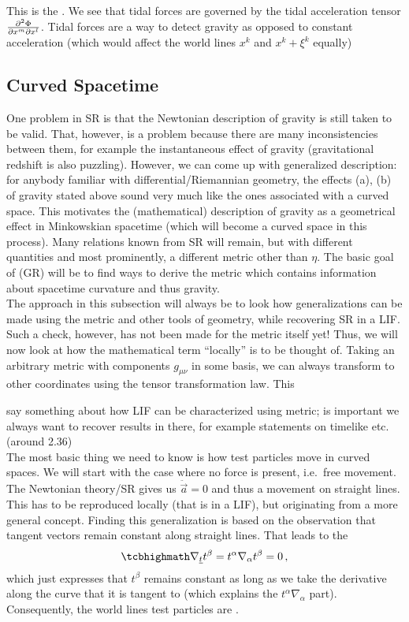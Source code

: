 This is the . We see that tidal forces are governed by the tidal acceleration tensor $\pdv[2]{\Phi}{x^m}{x^l}$. Tidal forces are a way to detect gravity as opposed to constant acceleration (which would affect the world lines $x^k$ and $x^k + \xi^k$ equally)



	\subsection{Curved Spacetime}
One problem in SR is that the Newtonian description of gravity is still taken to be valid. That, however, is a problem because there are many inconsistencies between them, for example the instantaneous effect of gravity (gravitational redshift is also puzzling). However, we can come up with generalized description: for anybody familiar with differential/Riemannian geometry, the effects (a), (b) of gravity stated above sound very much like the ones associated with a curved space. This motivates the (mathematical) description of gravity as a geometrical effect in Minkowskian spacetime (which will become a curved space in this process). Many relations known from SR will remain, but with different quantities and most prominently, a different metric other than $\eta$. The basic goal of  (GR) will be to find ways to derive the metric which contains information about spacetime curvature and thus gravity.\\


The approach in this subsection will always be to look how generalizations can be made using the metric and other tools of geometry, while recovering SR in a LIF. Such a check, however, has not been made for the metric itself yet! Thus, we will now look at how the mathematical term \enquote{locally} is to be thought of. Taking an arbitrary metric with components $g_{\mu \nu}$ in some basis, we can always transform to other coordinates using the tensor transformation law. This

say something about how LIF can be characterized using metric; is important we always want to recover results in there, for example statements on timelike etc. (around 2.36)\\


The most basic thing we need to know is how test particles move in curved spaces. We will start with the case where no force is present, i.e.~free movement. The Newtonian theory/SR gives us $\ddot{\vec{a}} = 0$ and thus a movement on straight lines. This has to be reproduced locally (that is in a LIF), but originating from a more general concept. Finding this generalization is based on the observation that tangent vectors remain constant along straight lines. That leads to the 
\begin{equation}
\eqbox{
\nabla_{\underline{t}} t^\beta = t^\alpha \nabla_\alpha t^\beta = 0
}\, ,
\end{equation}
which just expresses that $t^\beta$ remains constant as long as we take the derivative along the curve that it is tangent to (which explains the $t^\alpha \nabla_\alpha$ part). Consequently, the world lines test particles are .

